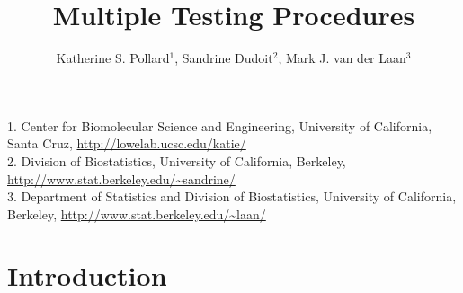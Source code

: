 \documentclass[11pt]{article}
\begin{document}
\title{Multiple Testing Procedures} 
\author{Katherine S. Pollard$^1$, Sandrine Dudoit$^2$, Mark J. van der Laan$^3$} 
\maketitle

\begin{center}
1. Center for Biomolecular Science and Engineering, University of California, Santa Cruz, \url{ http://lowelab.ucsc.edu/katie/}\\
2. Division of Biostatistics, University of California, Berkeley, \url{ http://www.stat.berkeley.edu/~sandrine/}\\
3. Department of Statistics and Division of Biostatistics, University of California, Berkeley, \url{ http://www.stat.berkeley.edu/~laan/}\\
\end{center}

\tableofcontents

\label{anal:mult:xmulttest}

\section{Introduction}
\label{anal:mult:s:intro}
\end{document}
